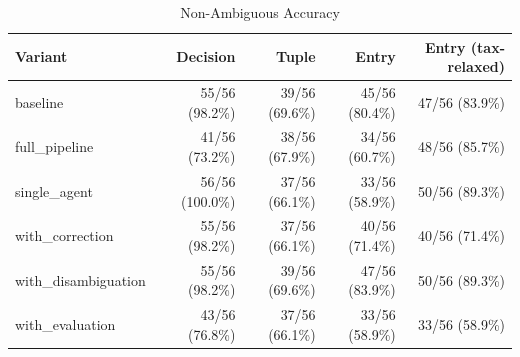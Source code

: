 \begin{table}[htbp]
\centering
\caption{Non-Ambiguous Accuracy}
\label{tab:acc-non-ambig}
\begin{tabular}{l rrrr}
\toprule
Variant & Decision & Tuple & Entry & Entry (tax-relaxed) \\
\midrule
  baseline & 55/56 (98.2\%) & 39/56 (69.6\%) & 45/56 (80.4\%) & 47/56 (83.9\%) \\
  full\_pipeline & 41/56 (73.2\%) & 38/56 (67.9\%) & 34/56 (60.7\%) & 48/56 (85.7\%) \\
  single\_agent & 56/56 (100.0\%) & 37/56 (66.1\%) & 33/56 (58.9\%) & 50/56 (89.3\%) \\
  with\_correction & 55/56 (98.2\%) & 37/56 (66.1\%) & 40/56 (71.4\%) & 40/56 (71.4\%) \\
  with\_disambiguation & 55/56 (98.2\%) & 39/56 (69.6\%) & 47/56 (83.9\%) & 50/56 (89.3\%) \\
  with\_evaluation & 43/56 (76.8\%) & 37/56 (66.1\%) & 33/56 (58.9\%) & 33/56 (58.9\%) \\
\bottomrule
\end{tabular}
\end{table}
